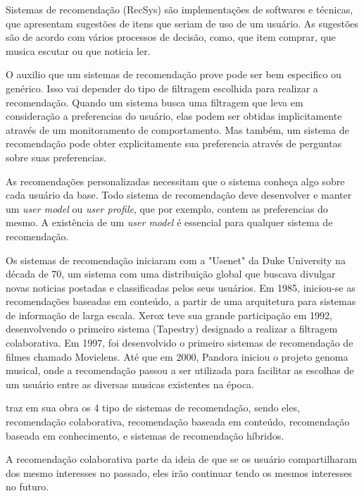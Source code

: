\documentclass{article}
\begin{document}
Sistemas de recomendação (RecSys) são implementações de softwares e técnicas, que apresentam sugestões de itens que seriam de uso de um usuário. As sugestões são de acordo com vários processos de decisão, como, que item comprar, que musica escutar ou que noticia ler.  \cite{ricci2011introduction}

O auxilio que um sistemas de recomendação prove pode ser bem especifico ou genérico. Isso vai depender do tipo de filtragem escolhida para realizar a recomendação. Quando um sistema busca uma filtragem que leva em consideração a preferencias do usuário, elas podem ser obtidas implicitamente através de um monitoramento de comportamento. Mas também, um sistema de recomendação pode obter explicitamente sua preferencia através de perguntas sobre suas preferencias.
\cite{jannach2010recommender}

As recomendações personalizadas necessitam que o sistema conheça algo sobre cada usuário da base.
Todo sistema de recomendação deve desenvolver e manter um \textit{user model} ou \textit{user profile}, que por exemplo, contem as preferencias do mesmo.
A existência de um \textit{user model} é essencial para qualquer sistema de recomendação. \cite{jannach2010recommender}

Os sistemas de recomendação iniciaram com a "Usenet" da Duke University na década de 70, um sistema com uma distribuição global que buscava divulgar novas noticias postadas e classificadas pelos seus usuários. Em 1985, iniciou-se as recomendações baseadas em conteúdo, a partir de uma arquitetura para sistemas de informação de larga escala. Xerox teve sua grande participação em 1992, desenvolvendo o primeiro sistema (Tapestry) designado a realizar a filtragem colaborativa. Em 1997, foi desenvolvido o primeiro sistemas de recomendação de filmes chamado Movielens. Até que em 2000, Pandora iniciou o projeto genoma musical, onde a recomendação passou a ser utilizada para facilitar as escolhas de um usuário entre as diversas musicas existentes na época. \cite{bhatnagar2016collaborative}

\cite{ricci2011introduction} traz em sua obra os 4 tipo de sistemas de recomendação, sendo eles, recomendação colaborativa, recomendação baseada em conteúdo, recomendação baseada em conhecimento, e sistemas de recomendação híbridos.

A recomendação colaborativa parte da ideia de que se os usuário compartilharam dos mesmo interesses no passado, eles irão continuar tendo os mesmos interesses no futuro. 
\end{document}
